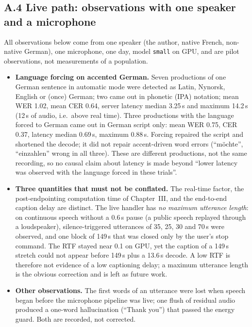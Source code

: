 \subsection*{A.4 Live path: observations with one speaker and a microphone}
All observations below come from one speaker (the author, native French, non-native German), one microphone,
one day, model \texttt{small} on GPU, and are pilot observations, not measurements of a population.
\begin{itemize}
  \item \textbf{Language forcing on accented German.} Seven productions of one German sentence in automatic mode
  were detected as Latin, Nynorsk, English or (once) German; two came out in phonetic (IPA) notation; mean WER
  1.02, mean CER 0.64, server latency median 3.25\,s and maximum 14.2\,s (12\,s of audio, i.e.\ above real time).
  Three productions with the language forced to German came out in German script only: mean WER 0.75, CER 0.37,
  latency median 0.69\,s, maximum 0.88\,s. Forcing repaired the script and shortened the decode; it did not repair
  accent-driven word errors (``möchte'', ``einzahlen'' wrong in all three). These are different productions, not
  the same recording, so no causal claim about latency is made beyond ``lower latency was observed with the
  language forced in these trials''.
  \item \textbf{Three quantities that must not be conflated.} The real-time factor, the post-endpointing
  computation time of Chapter~III, and the end-to-end caption delay are distinct. The live handler has
  \emph{no maximum utterance length}: on continuous speech without a $0.6$\,s pause (a public speech replayed
  through a loudspeaker), silence-triggered utterances of 35, 25, 30 and 70\,s were observed, and one block of
  149\,s that was closed only by the user's stop command. The RTF stayed near 0.1 on GPU, yet the caption of a
  149\,s stretch could not appear before 149\,s plus a 13.6\,s decode. A low RTF is therefore not evidence of a
  low captioning delay; a maximum utterance length is the obvious correction and is left as future work.
  \item \textbf{Other observations.} The first words of an utterance were lost when speech began before the
  microphone pipeline was live; one flush of residual audio produced a one-word hallucination (``Thank you'')
  that passed the energy guard. Both are recorded, not corrected.
\end{itemize}

